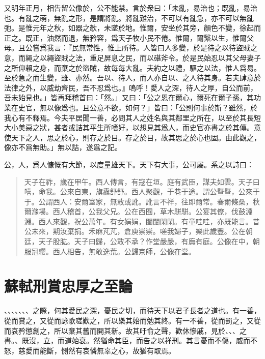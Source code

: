 又明年正月，相告留公像於，公不能禁。言於衆曰：「未亂，易治也；既亂，易治也。有亂之萌，無亂之形，是謂將亂。將亂難治，不可以有亂急，亦不可以無亂弛。是惟元年之秋，如器之欹，未墜於地。惟爾，安坐於其旁，顏色不變，徐起而正之。既正，油然而退，無矜容，爲天子牧小民不倦。惟爾，爾繄以生，惟爾父母。且公嘗爲我言：『民無常性，惟上所待。人皆曰人多變，於是待之以待盜賊之意，而繩之以繩盜賊之法，重足屏息之民，而以碪斧令。於是民始忍以其父母妻子之所仰賴之身，而棄之於盜賊，故每每大亂。夫約之以禮，驅之以法，惟人爲易。至於急之而生變，雖、亦然。吾以、待人，而人亦自以、之人待其身。若夫肆意於法律之外，以威劫{齊}民，吾不忍爲也。』嗚呼！愛人之深，待人之厚，自公而前，吾未始見也。」皆再拜稽首曰：「然。」又曰：「公之恩在爾心，爾死在爾子孫，其功業在史官，無以像爲也。且公意不欲，如何？」皆曰：「公則何事於斯？雖然，於我心有不釋焉。今夫平居聞一善，必問其人之姓名與其鄰里之所在，以至於其長短大小美惡之狀，甚者或詰其平生所嗜好，以想見其爲人，而史官亦書之於其傳。意使天下之人，思之於心，則存之於目。存之於目，故其思之於心也固。由此觀之，像亦不爲無助。」無以詰，遂爲之記。

公，人，爲人慷慨有大節，以度量雄天下。天下有大事，公可屬。系之以詩曰：
\begin{quote}
    天子在祚，歲在甲午。西人傳言，有寇在垣。庭有武臣，謀夫如雲。天子曰嘻，命我。公來自東，旗纛舒舒。西人聚觀，于巷于途。謂公暨暨，公來于于。公謂西人：安爾室家，無敢或訛。訛言不祥，往即爾常。春爾條桑，秋爾滌場。西人稽首，公我父兄。公在西囿，草木駢駢。公宴其僚，伐鼓淵淵。西人來觀，祝公萬年。有女娟娟，閨闥閑閑。有童哇哇，亦既能言。昔公未來，期汝棄捐。禾麻芃芃，倉庾崇崇。嗟我婦子，樂此歲豐。公在朝廷，天子股肱。天子曰歸，公敢不承？作堂嚴嚴，有廡有庭。公像在中，朝服冠纓。西人相告，無敢逸荒。公歸京師，公像在堂。
\end{quote}
\nopagebreak
\theendnotes

\section[刑賞忠厚之至論\quad{\small 蘇軾}]{{\normalsize 蘇軾}\quad 刑賞忠厚之至論}
、、、、、、、之際，何其愛民之深，憂民之切，而待天下以君子長者之道也。有一善，從而賞之，又從而詠歌嗟歎之，所以樂其始而勉其終。有一不善，從而罰之，又從而哀矜懲創之，所以棄其舊而開其新。故其吁俞之聲，歡休慘戚，見於、、、之書。、既沒，立，而道始衰。然猶命其臣，而告之以祥刑。其言憂而不傷，威而不怒，慈愛而能斷，惻然有哀憐無辜之心，故猶有取焉。

